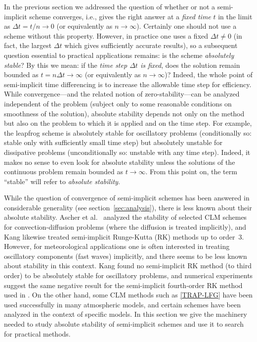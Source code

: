 \documentclass[12pt]{article}
\newcommand{\dt}{\Delta t}
\begin{document}
In the previous section we addressed the question of whether or not a
semi-implicit scheme converges, i.e., gives the right answer at a \emph{fixed
time} $t$ in the limit as $\dt=t/n\to0$ (or equivalently as $n\to\infty$).
Certainly one should not use a scheme without this property.  However, in
practice one uses a fixed $\dt\ne0$ (in fact, the largest $\dt$ which gives
sufficiently accurate results), so a subsequent question essential to
practical applications remains:  is the scheme \emph{absolutely stable}?  By
this we mean:  if the \emph{time step $\dt$ is fixed}, does the solution
remain bounded as $t=n\dt\to\infty$ (or equivalently as $n\to\infty$)?
Indeed, the whole point of semi-implicit time differencing is to increase the
allowable time step for efficiency.  While convergence---and the related
notion of zero-stability---can be analyzed independent of the problem (subject
only to some reasonable conditions on smoothness of the solution), absolute
stability depends not only on the method but also on the problem to which it
is applied and on the time step.  For example, the leapfrog scheme is
absolutely stable for oscillatory problems (conditionally so:  stable only
with sufficiently small time step) but absolutely unstable for dissipative
problems (unconditionally so: unstable with any time step).  
Indeed, it makes no sense to even look for absolute stability unless the
solutions of the continuous problem remain bounded as $t\to\infty$.  From this
point on, the term ``stable'' will refer to \emph{absolute stability}.

While the question of convergence of semi-implicit schemes has been answered
in considerable generality (see section~\ref{sec:analysis}), there is less
known about their absolute stability.  Ascher et
al.~\cite{Ascher_Ruuth_Wetton95} analyzed the stability of selected CLM
schemes for convection-diffusion problems (where the diffusion is treated
implicitly), and Kang \cite{Kang94} likewise treated semi-implicit Runge-Kutta
(RK) methods up to order~3.  However, for meteorological applications one is
often interested in treating oscillatory components (fast waves) implicitly,
and there seems to be less known about stability in this context.  Kang
\cite{Kang94} found no semi-implicit RK method (to third order) to be
absolutely stable for oscillatory problems, and numerical experiments suggest
the same negative result for the semi-implicit fourth-order RK method used in
\cite{Fulton93}.  On the other hand, some CLM methods such as \eqref{TRAP-LFG}
have been used successfully in many atmospheric models, and certain schemes
have been analyzed in the context of specific models.  In this section we give
the machinery needed to study absolute stability of semi-implicit schemes and
use it to search for practical methods.
\end{document}
